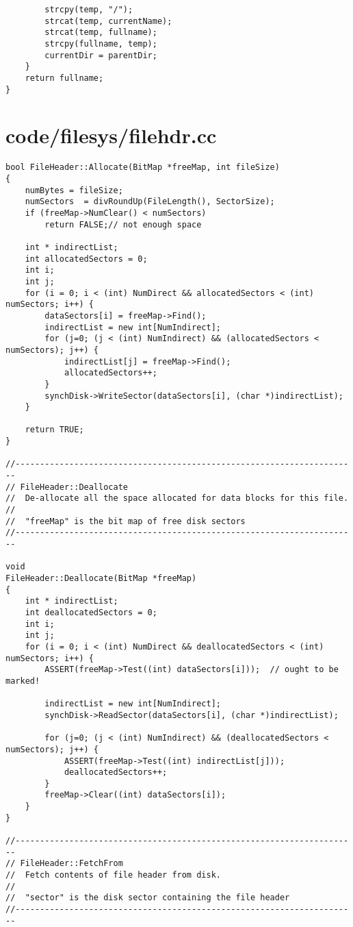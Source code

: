 \documentclass[a4paper,10pt]{article}
\begin{document}
\begin{lstlisting}
        strcpy(temp, "/");
        strcat(temp, currentName);
        strcat(temp, fullname);
        strcpy(fullname, temp);
        currentDir = parentDir;
    }
    return fullname;
}

\end{lstlisting}

\section{code/filesys/filehdr.cc}
\begin{lstlisting}
bool FileHeader::Allocate(BitMap *freeMap, int fileSize)
{
    numBytes = fileSize;
    numSectors  = divRoundUp(FileLength(), SectorSize);
    if (freeMap->NumClear() < numSectors)
        return FALSE;// not enough space

    int * indirectList;
    int allocatedSectors = 0;
    int i;
    int j;
    for (i = 0; i < (int) NumDirect && allocatedSectors < (int) numSectors; i++) {
        dataSectors[i] = freeMap->Find();
        indirectList = new int[NumIndirect];
        for (j=0; (j < (int) NumIndirect) && (allocatedSectors < numSectors); j++) {
            indirectList[j] = freeMap->Find();
            allocatedSectors++;
        }
        synchDisk->WriteSector(dataSectors[i], (char *)indirectList);
    }

    return TRUE;
}

//----------------------------------------------------------------------
// FileHeader::Deallocate
// 	De-allocate all the space allocated for data blocks for this file.
//
//	"freeMap" is the bit map of free disk sectors
//----------------------------------------------------------------------

void
FileHeader::Deallocate(BitMap *freeMap)
{
    int * indirectList;
    int deallocatedSectors = 0;
    int i;
    int j;
    for (i = 0; i < (int) NumDirect && deallocatedSectors < (int) numSectors; i++) {
        ASSERT(freeMap->Test((int) dataSectors[i]));  // ought to be marked!

        indirectList = new int[NumIndirect];
        synchDisk->ReadSector(dataSectors[i], (char *)indirectList);

        for (j=0; (j < (int) NumIndirect) && (deallocatedSectors < numSectors); j++) {
            ASSERT(freeMap->Test((int) indirectList[j]));
            deallocatedSectors++;
        }
        freeMap->Clear((int) dataSectors[i]);
    }
}

//----------------------------------------------------------------------
// FileHeader::FetchFrom
// 	Fetch contents of file header from disk.
//
//	"sector" is the disk sector containing the file header
//----------------------------------------------------------------------


\end{lstlisting}
\end{document}
